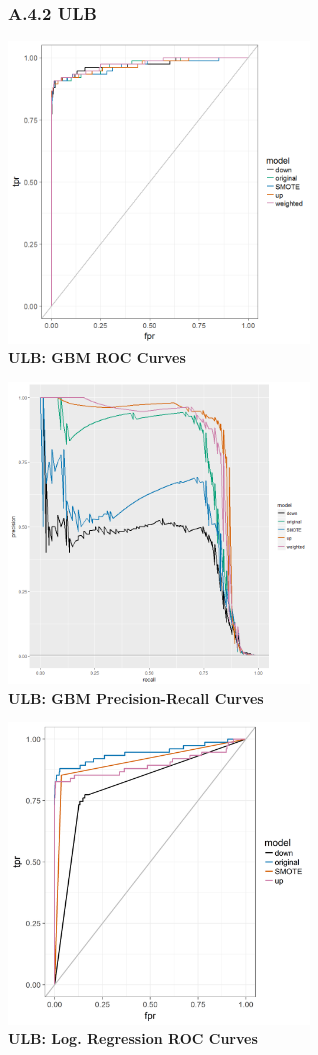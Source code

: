 \documentclass[12pt,]{article}
\begin{document}
\justify

\hypertarget{a.4.2-ulb}{%
\subsubsection{A.4.2 ULB}\label{a.4.2-ulb}}

\center

\includegraphics[width=0.6\textwidth,height=\textheight]{figures/credit/cr_card_gbm_rocs.png}\\
\textbf{ULB: GBM ROC Curves}

\includegraphics[width=0.6\textwidth,height=\textheight]{figures/credit/cr_card_gbm_PR.png}\\
\textbf{ULB: GBM Precision-Recall Curves}

\includegraphics[width=0.6\textwidth,height=\textheight]{figures/credit/cr_card_glm_rocs.png}\\
\textbf{ULB: Log. Regression ROC Curves}
\end{document}
